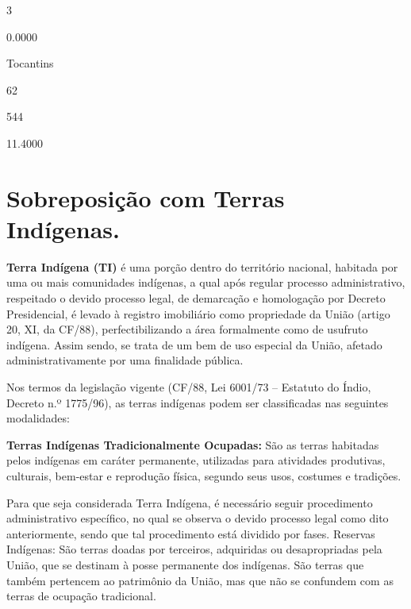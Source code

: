 \documentclass[
  letterpaper,
]{report}
\begin{document}
\n      

3

\n      

0.0000

\n    

\n    

\n      

Tocantins

\n      

62

\n      

544

\n      

11.4000

\n    

\n  

\n


\hypertarget{sobreposiuxe7uxe3o-com-terras-induxedgenas.}{%
\chapter{Sobreposição com Terras
Indígenas.}\label{sobreposiuxe7uxe3o-com-terras-induxedgenas.}}

\textbf{Terra Indígena (TI)} é uma porção dentro do território nacional,
habitada por uma ou mais comunidades indígenas, a qual após regular
processo administrativo, respeitado o devido processo legal, de
demarcação e homologação por Decreto Presidencial, é levado à registro
imobiliário como propriedade da União (artigo 20, XI, da CF/88),
perfectibilizando a área formalmente como de usufruto indígena. Assim
sendo, se trata de um bem de uso especial da União, afetado
administrativamente por uma finalidade pública.

Nos termos da legislação vigente (CF/88, Lei 6001/73 -- Estatuto do
Índio, Decreto n.º 1775/96), as terras indígenas podem ser classificadas
nas seguintes modalidades:

\textbf{Terras Indígenas Tradicionalmente Ocupadas:} São as terras
habitadas pelos indígenas em caráter permanente, utilizadas para
atividades produtivas, culturais, bem-estar e reprodução física, segundo
seus usos, costumes e tradições.

Para que seja considerada Terra Indígena, é necessário seguir
procedimento administrativo específico, no qual se observa o devido
processo legal como dito anteriormente, sendo que tal procedimento está
dividido por fases. Reservas Indígenas: São terras doadas por terceiros,
adquiridas ou desapropriadas pela União, que se destinam à posse
permanente dos indígenas. São terras que também pertencem ao patrimônio
da União, mas que não se confundem com as terras de ocupação
tradicional.
\end{document}
